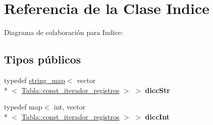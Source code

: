 \hypertarget{classIndice}{\section{Referencia de la Clase Indice}
\label{classIndice}
}


Diagrama de colaboración para Indice\+:
\subsection*{Tipos públicos}
\begin{DoxyCompactItemize}
\item 
\hypertarget{classIndice_af8293efc826b40e698c7ce37e5012ed5}{typedef \hyperlink{classstring__map}{string\+\_\+map}$<$ vector\\*
$<$ \hyperlink{classTabla_1_1const__iterador__registros}{Tabla\+::const\+\_\+iterador\+\_\+registros} $>$ $>$ {\bfseries dicc\+Str}}\label{classIndice_af8293efc826b40e698c7ce37e5012ed5}

\item 
\hypertarget{classIndice_a55ad820daaf3d9adeaf24550a81c7f89}{typedef map$<$ int, vector\\*
$<$ \hyperlink{classTabla_1_1const__iterador__registros}{Tabla\+::const\+\_\+iterador\+\_\+registros} $>$ $>$ {\bfseries dicc\+Int}}\label{classIndice_a55ad820daaf3d9adeaf24550a81c7f89}

\end{DoxyCompactItemize}
